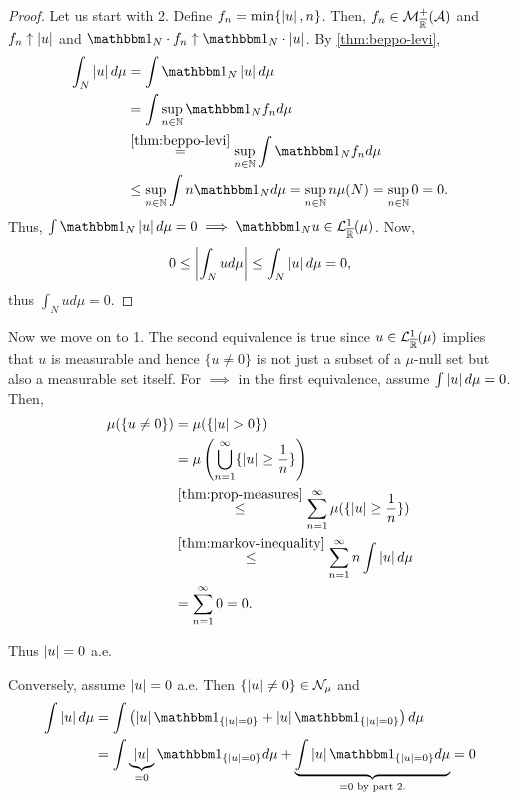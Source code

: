 \begin{proof}
	Let us start with 2. Define $f_n = \min\{ \left\vert{u}\right\vert, n\}$. Then, $f_n \in \mathcal{M}_{\overline{\mathbb{R}}}^+(\mathcal{A})$ and $f_n \uparrow \left\vert{u}\right\vert$ and $\ind_N \cdot f_n \uparrow \ind_N \cdot \abs{u}$. By \autoref{thm:beppo-levi}, 
	\begin{align*}
		\int_N \abs{u} d\mu
		&= \int \ind_N \abs{u}d\mu\\
		&= \int \sup_{n\in \N} \ind_N f_n d\mu\\
		&\overset{\ref{thm:beppo-levi}}{=} \sup_{n\in\N} \int \ind_N f_n d\mu\\
		&\leq \sup_{n\in \N} \int n \ind_N d\mu = \sup_{n\in\N} n \mu(N) = \sup_{n\in\N} 0 = 0.
	\end{align*}
	Thus, $\int \ind_N \abs{u} d\mu = 0 \implies \ind_N u \in  \calL_\Rb^1(\mu)$. Now,
	\begin{align*}
		0 \leq \left\vert{ \int_N u d\mu }\right\vert \leq \int_N \left\vert{u}\right\vert d\mu = 0,
	\end{align*}
	thus $\int_N u d\mu = 0$.
\end{proof}

Now we move on to 1. The second equivalence is true since $u \in \mathcal{L}_{\overline{\mathbb{R}}}^1(\mu)$ implies that $u$ is measurable and hence $\{u \neq 0\}$ is not just a subset of a $\mu$-null set but also a measurable set itself. For $\implies$ in the first equivalence, assume $\int \left\vert{u}\right\vert d\mu = 0$. Then,
\begin{align*}
	\mu(\{u \neq 0 \})
	&= \mu(\{ \left\vert{u}\right\vert > 0 \}) \\
	&= \mu \left( \bigcup_{n = 1}^\infty \{\left\vert{u}\right\vert \geq \frac{1}{n}\} \right) \\
	&\overset{\ref{thm:prop-measures}}{\leq} \sum_{n=1}^\infty \mu(\{ \left\vert{u}\right\vert \geq \frac{1}{n} \}) \\
	&\overset{\ref{thm:markov-inequality}}{\leq} \sum_{n=1}^\infty n \int \left\vert{u}\right\vert d\mu \\
	&= \sum_{n=1}^\infty 0 = 0.
\end{align*}

Thus $\left\vert{u}\right\vert = 0$ a.e.

Conversely, assume $\left\vert{u}\right\vert = 0$ a.e. Then $\{\left\vert{u}\right\vert \neq 0 \} \in \mathcal{N}_\mu$ and 
\begin{align*}
	\int \abs{u} d\mu
	&= \int \left( \abs{u} \ind_{\{\abs{u} = 0\}} + \abs{u} \ind_{\{ \abs{u} = 0 \}} \right)d \mu\\
	&= \int \underbrace{\abs{u}}_{= 0} \ind_{\{\abs{u} = 0\}} d\mu + \underbrace{\int \abs{u} \ind_{\{ \abs{u} = 0 \}} d\mu}_{= 0 \text{ by part 2.}} = 0
\end{align*}

